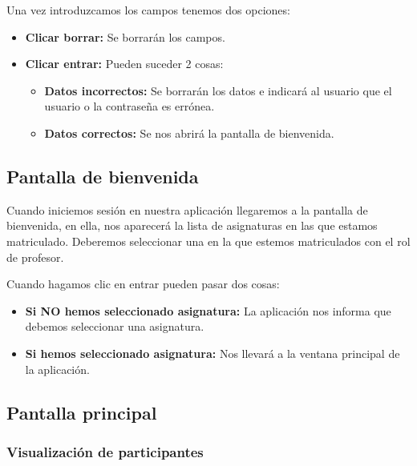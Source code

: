 Una vez introduzcamos los campos tenemos dos opciones:

\begin{itemize}
	\tightlist
	\item
	\textbf{Clicar borrar:} Se borrarán los campos.
	\item
	\textbf{Clicar entrar:} Pueden suceder 2 cosas:
	\begin{itemize}
		\tightlist
		\item
		\textbf{Datos incorrectos:} Se borrarán los datos e indicará al usuario que el usuario o la contraseña es errónea.
		\item
		\textbf{Datos correctos:} Se nos abrirá la pantalla de bienvenida.
	\end{itemize}
\end{itemize}

\subsection{Pantalla de bienvenida}


Cuando iniciemos sesión en nuestra aplicación llegaremos a la pantalla de bienvenida, en ella, nos aparecerá la lista de asignaturas en las que estamos matriculado. Deberemos seleccionar una en la que estemos matriculados con el rol de profesor.


Cuando hagamos clic en entrar pueden pasar dos cosas:

\begin{itemize}
	\tightlist
	\item
	\textbf{Si NO hemos seleccionado asignatura:} La aplicación nos informa que debemos seleccionar una asignatura.
	\item
	\textbf{Si hemos seleccionado asignatura:} Nos llevará a la ventana principal de la aplicación.
	
\end{itemize}
\newpage
\subsection{Pantalla principal}


\subsubsection{Visualización de participantes}

